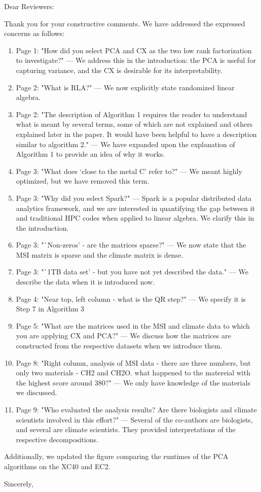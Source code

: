 \documentclass{letter}
\begin{document}
\begin{letter}{}
\opening{Dear Reviewers:}

Thank you for your constructive comments. We have addressed the expressed concerns as follows:
\begin{enumerate}
\item Page 1: "How did you select PCA and CX as the two low rank factorization to
  investigate?" --- We address this in the introduction: the PCA is useful for
  capturing variance, and the CX is desirable for its interpretability.
\item Page 2: "What is RLA?" --- We now explicitly state randomized linear algebra.
\item Page 2: "The description of Algorithm 1 requires the reader to understand what is
  meant by several terms, some of which are not explained and others explained
  later in the paper. It would have been helpful to have a description similar
  to algorithm 2." --- We have expanded upon the explanation of Algorithm 1 to provide an idea of why it works.
\item Page 3: "What does `close to the metal C' refer to?" --- We meant highly optimized, but we have removed this term.
\item Page 3: "Why did you select Spark?" --- Spark is a popular distributed data analytics framework, and we are interested in quantifying the gap between it and traditional HPC codes when applied to linear algebra. We clarify this in the introduction.
\item Page 3: "`Non-zeros' - are the matrices sparse?" --- We now state that the MSI matrix is sparse and the climate matrix is dense.
\item Page 3: "`1TB data set' - but you have not yet described the data." --- We describe the data when it is introduced now.
\item Page 4: "Near top, left column - what is the QR step?" --- We specify it is Step 7 in Algorithm 3
\item Page 5: "What are the matrices used in the MSI and climate data to which you are applying CX and PCA?" --- We discuss how the matrices are constructed from the respective datasets when we introduce them.
\item Page 8: "Right column, analysis of MSI data - there are three numbers, but only two materials - CH2 and CH2O. what happened to the matereial with the highest score around 380?" --- We only have knowledge of the materials we discussed.
\item Page 9: "Who evaluated the analysis results? Are there biologists and climate scientists involved in this effort?" --- Several of the co-authors are biologists, and several are climate scientists. They provided interpretations of the respective decompositions.
\end{enumerate}
Additionally, we updated the figure comparing the runtimes of the PCA algorithms on the XC40 and EC2.
\closing{Sincerely,}
\end{letter}
\end{document}
